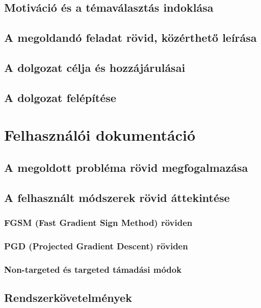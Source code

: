 \documentclass[12pt,a4paper]{article}
\begin{document}
\subsection{Motiváció és a témaválasztás indoklása}

\subsection{A megoldandó feladat rövid, közérthető leírása}

\subsection{A dolgozat célja és hozzájárulásai}

\subsection{A dolgozat felépítése}

\newpage
\section{Felhasználói dokumentáció}

\subsection{A megoldott probléma rövid megfogalmazása}

\subsection{A felhasznált módszerek rövid áttekintése}

\subsubsection{FGSM (Fast Gradient Sign Method) röviden}

\subsubsection{PGD (Projected Gradient Descent) röviden}

\subsubsection{Non-targeted és targeted támadási módok}

\subsection{Rendszerkövetelmények}
\end{document}
